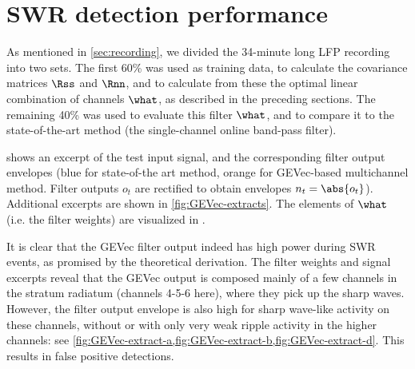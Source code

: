 \section{SWR detection performance}

As mentioned in \cref{sec:recording}, we divided the 34-minute long LFP recording into two sets. The first 60\% was used as training data, to calculate the covariance matrices $\Rss$ and $\Rnn$, and to calculate from these the optimal linear combination of channels $\what$, as described in the preceding sections. The remaining 40\% was used to evaluate this filter $\what$, and to compare it to the state-of-the-art method (the single-channel online band-pass filter).


\begin{figure}
\label{fig:LSM-comp}
\end{figure}

 shows an excerpt of the test input signal, and the corresponding filter output envelopes (blue for state-of-the art method, orange for GEVec-based multichannel method. Filter outputs $o_t$ are rectified to obtain envelopes $n_t = \abs{o_t}$). Additional excerpts are shown in \cref{fig:GEVec-extracts}. The elements of $\what$ (i.e. the filter weights) are visualized in .

It is clear that the GEVec filter output indeed has high power during SWR events, as promised by the theoretical derivation. The filter weights and signal excerpts reveal that the GEVec output is composed mainly of a few channels in the stratum radiatum (channels 4-5-6 here), where they pick up the sharp waves. However, the filter output envelope is also high for sharp wave-like activity on these channels, without or with only very weak ripple activity in the higher channels: see \cref{fig:GEVec-extract-a,fig:GEVec-extract-b,fig:GEVec-extract-d}. This results in false positive detections.

